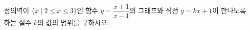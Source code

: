 \hspace*{2mm}\begin{minipage}[t]{\dimexpr\linewidth-2mm\relax}\vspace{0pt}
정의역이 $\{x \mid 2\le x\le 3\}$인 함수 $y=\dfrac{x+1}{x-1}$의 그래프와 직선 $y=kx+1$이 만나도록 하는 실수 $k$의 값의 범위를 구하시오.\end{minipage}
